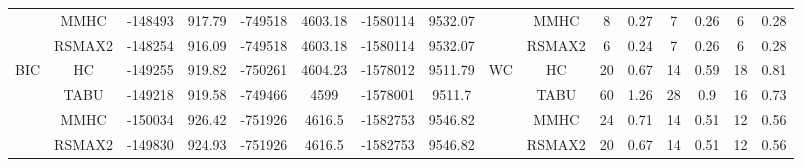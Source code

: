 \begin{table}[p]
{\begin{tabular}{cc||cc|cc|cc||cc|cc|cc|cc}
& MMHC &	-148493 & 	917.79 & 	-749518 & 	4603.18 & 	-1580114 & 	9532.07 & 	& MMHC &	8 & 	0.27 & 	7 & 	0.26 & 	6 & 	0.28\tabularnewline													
& RSMAX2 &	-148254 & 	916.09 & 	-749518 & 	4603.18 & 	-1580114 & 	9532.07 & 	& RSMAX2 &	6 & 	0.24 & 	7 & 	0.26 & 	6 & 	0.28\tabularnewline													
\hline																										
\multirow{4}{*}{BIC} & HC &	-149255 & 	919.82 & 	-750261 & 	4604.23 & 	-1578012 & 	9511.79 & 	\multirow{4}{*}{WC} & HC &	20 & 	0.67 & 	14 & 	0.59 & 	18 & 	0.81\tabularnewline													
& TABU &	-149218 & 	919.58 & 	-749466 & 	4599 & 	-1578001 & 	9511.7 & 	& TABU &	60 & 	1.26 & 	28 & 	0.9 & 	16 & 	0.73\tabularnewline													
& MMHC &	-150034 & 	926.42 & 	-751926 & 	4616.5 & 	-1582753 & 	9546.82 & 	& MMHC &	24 & 	0.71 & 	14 & 	0.51 & 	12 & 	0.56\tabularnewline													
& RSMAX2 &	-149830 & 	924.93 & 	-751926 & 	4616.5 & 	-1582753 & 	9546.82 & 	& RSMAX2 &	20 & 	0.67 & 	14 & 	0.51 & 	12 & 	0.56\tabularnewline													
\hline																										
\end{tabular}																										
}																										
\end{table}																										



